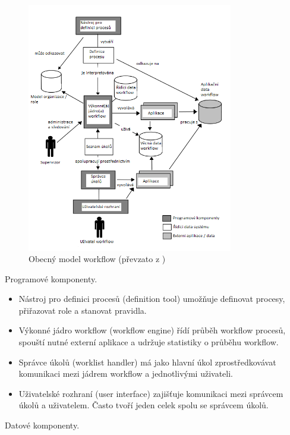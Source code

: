 \documentclass{fithesis}
\begin{document}
\begin{figure}[htp]
\centering
\includegraphics[width=340px]{images/obecny_model.png}
\caption{Obecný model workflow (převzato z \cite{wfmc})}
\end{figure}

Programové komponenty.

\begin{itemize}
\item Nástroj pro definici procesů (definition tool) umožňuje definovat procesy, přiřazovat role a stanovat pravidla.
\item Výkonné jádro workflow (workflow engine) řídí průběh workflow procesů, spouští nutné externí aplikace a udržuje statistiky o průběhu workflow.
\item Správce úkolů (worklist handler) má jako hlavní úkol zprostředkovávat komunikaci mezi jádrem workflow a jednotlivými uživateli.
\item Uživatelské rozhraní (user interface) zajišťuje komunikaci mezi správcem úkolů a uživatelem. Často tvoří jeden celek spolu se správcem úkolů.
\end{itemize}

Datové komponenty.
\end{document}
